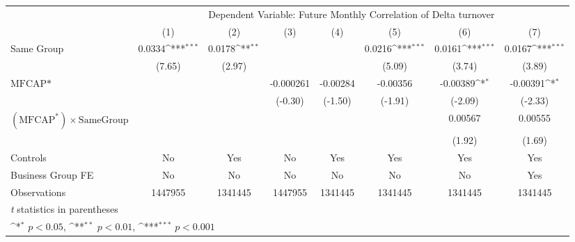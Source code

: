 {
\def\sym#1{\ifmmode^{#1}\else\(^{#1}\)\fi}
\begin{tabular}{l*{7}{c}}
\hline\hline
                &\multicolumn{7}{c}{Dependent Variable: Future Monthly Correlation of Delta turnover}                                                \\\cmidrule(lr){2-8}
                &\multicolumn{1}{c}{(1)}         &\multicolumn{1}{c}{(2)}         &\multicolumn{1}{c}{(3)}         &\multicolumn{1}{c}{(4)}         &\multicolumn{1}{c}{(5)}         &\multicolumn{1}{c}{(6)}         &\multicolumn{1}{c}{(7)}         \\
\hline
Same Group      &   0.0334\sym{***}&   0.0178\sym{**} &                  &                  &   0.0216\sym{***}&   0.0161\sym{***}&   0.0167\sym{***}\\
                &   (7.65)         &   (2.97)         &                  &                  &   (5.09)         &   (3.74)         &   (3.89)         \\
[1em]
$ \text{MFCAP*} $&                  &                  &-0.000261         & -0.00284         & -0.00356         & -0.00389\sym{*}  & -0.00391\sym{*}  \\
                &                  &                  &  (-0.30)         &  (-1.50)         &  (-1.91)         &  (-2.09)         &  (-2.33)         \\
[1em]
 $ (\text{MFCAP}^*) \times {\text{SameGroup} }  $ &                  &                  &                  &                  &                  &  0.00567         &  0.00555         \\
                &                  &                  &                  &                  &                  &   (1.92)         &   (1.69)         \\
\hline
Controls        &       No         &      Yes         &       No         &      Yes         &      Yes         &      Yes         &      Yes         \\
Business Group FE&       No         &       No         &       No         &       No         &       No         &       No         &      Yes         \\
Observations    &  1447955         &  1341445         &  1447955         &  1341445         &  1341445         &  1341445         &  1341445         \\
\hline\hline
\multicolumn{8}{l}{\footnotesize \textit{t} statistics in parentheses}\\
\multicolumn{8}{l}{\footnotesize \sym{*} \(p<0.05\), \sym{**} \(p<0.01\), \sym{***} \(p<0.001\)}\\
\end{tabular}
}
